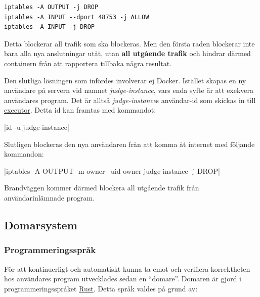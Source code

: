 \documentclass{article}
\begin{document}
\begin{verbatim}
iptables -A OUTPUT -j DROP
iptables -A INPUT --dport 48753 -j ALLOW
iptables -A INPUT -j DROP
\end{verbatim}


Detta blockerar all trafik som ska blockeras. Men den första raden blockerar
inte bara alla nya anslutningar utåt, utan \textbf{all utgående trafik} och
hindrar därmed containern från att rapportera tillbaka några resultat.

Den slutliga lösningen som infördes involverar ej Docker. Istället skapas
en ny användare på servern vid namnet \textit{judge-instance}, vars enda
syfte är att exekvera användares program. Det är alltså \textit{judge-instance}s
användar-id som skickas in till \hyperlink{executor}{executor}.
Detta id kan framtas med kommandot:

|id -u judge-instance|

Slutligen blockeras den nya användaren från att komma åt internet med följande
kommandon:

|iptables -A OUTPUT -m owner --uid-owner judge-instance -j DROP|

Brandväggen kommer därmed blockera all utgående trafik från användarinlämnade
program.

\subsection{Domarsystem}

\subsubsection{Programmeringsspråk}

För att kontinuerligt och automatiskt kunna ta emot och verifiera korrektheten
hos användares program utvecklades sedan en ``domare''. Domaren är gjord i
programmeringsspråket \href{https://rust-lang.org}{Rust}. Detta språk valdes på
grund av:
\end{document}

